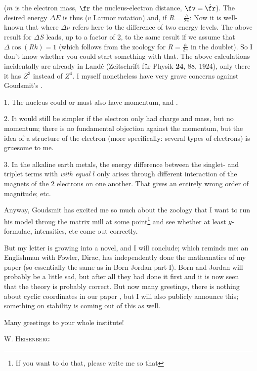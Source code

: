 ($m$ is the electron mass, $\fr$ the nucleus-electron distance, $\fv=\dot{\fr}$).
The desired energy $\Delta E$ is thus ($v$ Larmor rotation)
and, if $R = \frac{h}{2\pi}$:
Now it is well-known that
where $\Delta \nu$ refers here to the difference of two energy levels. The above result for $\Delta S$ leads, up to a factor of 2, to the same result if we assume that $\Delta\cos{(Rk)}=1$ (which follows from the zoology for $R=\frac{h}{2\pi}$ in the doublet). So I don't know whether you could start something with that. The above calculations incidentally are already in Land\'e (Zeitschrift f\"ur Physik \textbf{24}, 88, 1924), only there it has $Z^3$ instead of $Z^4$. I myself nonetheless have very grave concerns against Goudsmit's .

1. The nucleus could or must also have momentum, and .

2. It would still be simpler if the electron only had charge and mass, but no momentum; there is no fundamental objection against the momentum, but the idea of a structure of the electron (more specifically: several types of electrons) is gruesome to me.

3. In the alkaline earth metals, the energy difference between the singlet- and triplet terms with \textit{with equal $l$} only arises through different interaction of the magnets of the 2 electrons on one another. That gives an entirely wrong order of magnitude; etc.

Anyway, Goudsmit has excited me so much about the zoology that I want to run his model throug the matrix mill at some point\footnote{If you want to do that, please write me so that } and see whether at least $g$-formulae, intensities, etc come out correctly.

But my letter is growing into a novel, and I will conclude; which reminds me: an Englishman with Fowler, Dirac, has independently done the mathematics of my paper (so essentially the same as in Born-Jordan part I). Born and Jordan will probably be a little sad, but after all they had done it first and it is now seen that the theory is probably correct. But now many greetings, there is nothing about cyclic coordinates in our paper , but I will also publicly announce this; something on stability is coming out of this as well.

Many greetings to your whole institute!

\textsc{W. Heisenberg}

